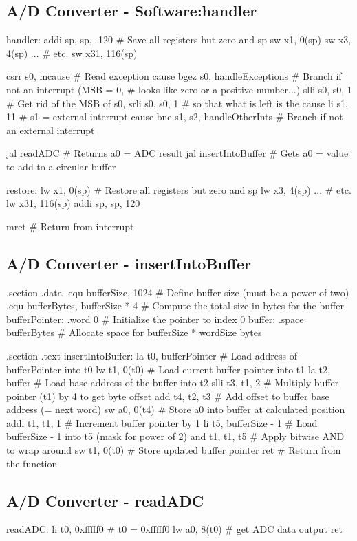 \subsection{A/D Converter - Software:handler}
\begin{assembly}
handler:
    addi sp, sp, -120          # Save all registers but zero and sp
    sw x1, 0(sp)
    sw x3, 4(sp)
    ...                        # etc.
    sw x31, 116(sp)

    csrr s0, mcause            # Read exception cause
    bgez s0, handleExceptions  # Branch if not an interrupt (MSB = 0, 
                                # looks like zero or a positive number...)
    slli s0, s0, 1             # Get rid of the MSB of s0,
    srli s0, s0, 1             # so that what is left is the cause
    li s1, 11                  # s1 = external interrupt cause
    bne s1, s2, handleOtherInts # Branch if not an external interrupt

    jal readADC                # Returns a0 = ADC result
    jal insertIntoBuffer       # Gets a0 = value to add to a circular buffer

restore:
    lw x1, 0(sp)               # Restore all registers but zero and sp
    lw x3, 4(sp)
    ...                        # etc.
    lw x31, 116(sp)
    addi sp, sp, 120

    mret                       # Return from interrupt
\end{assembly}

\subsection{A/D Converter - insertIntoBuffer}
\begin{assembly}
.section .data
    .equ bufferSize, 1024              # Define buffer size (must be a power of two)
    .equ bufferBytes, bufferSize * 4  # Compute the total size in bytes for the buffer
    bufferPointer:
        .word 0                       # Initialize the pointer to index 0
    buffer:
        .space bufferBytes            # Allocate space for bufferSize * wordSize bytes

.section .text
insertIntoBuffer:
    la    t0, bufferPointer           # Load address of bufferPointer into t0
    lw    t1, 0(t0)                   # Load current buffer pointer into t1
    la    t2, buffer                  # Load base address of the buffer into t2
    slli  t3, t1, 2                   # Multiply buffer pointer (t1) by 4 to get byte offset
    add   t4, t2, t3                  # Add offset to buffer base address (= next word)
    sw    a0, 0(t4)                   # Store a0 into buffer at calculated position
    addi  t1, t1, 1                   # Increment buffer pointer by 1
    li    t5, bufferSize - 1          # Load bufferSize - 1 into t5 (mask for power of 2)
    and   t1, t1, t5                  # Apply bitwise AND to wrap around
    sw    t1, 0(t0)                   # Store updated buffer pointer
    ret                               # Return from the function
\end{assembly}
    \newpage
\subsection{A/D Converter - readADC}
\begin{assembly}
readADC: 
    li t0, 0xfffff0 # t0 = 0xfffff0
    lw a0, 8(t0) # get ADC data output
    ret
\end{assembly}
